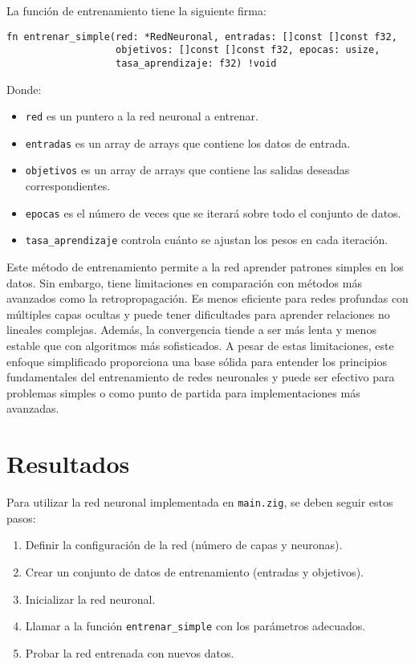 \documentclass[twocolumn]{article}
\begin{document}
La función de entrenamiento tiene la siguiente firma:
\begin{lstlisting}[style=customcode]
fn entrenar_simple(red: *RedNeuronal, entradas: []const []const f32, 
                   objetivos: []const []const f32, epocas: usize, 
                   tasa_aprendizaje: f32) !void
\end{lstlisting}

Donde:
\begin{itemize}
    \item \texttt{red} es un puntero a la red neuronal a entrenar.
    \item \texttt{entradas} es un array de arrays que contiene los datos de entrada.
    \item \texttt{objetivos} es un array de arrays que contiene las salidas deseadas correspondientes.
    \item \texttt{epocas} es el número de veces que se iterará sobre todo el conjunto de datos.
    \item \texttt{tasa\_aprendizaje} controla cuánto se ajustan los pesos en cada iteración.
\end{itemize}

Este método de entrenamiento permite a la red aprender patrones simples en los datos. Sin embargo, tiene limitaciones en comparación con métodos más avanzados como la retropropagación. Es menos eficiente para redes profundas con múltiples capas ocultas y puede tener dificultades para aprender relaciones no lineales complejas. Además, la convergencia tiende a ser más lenta y menos estable que con algoritmos más sofisticados. A pesar de estas limitaciones, este enfoque simplificado proporciona una base sólida para entender los principios fundamentales del entrenamiento de redes neuronales y puede ser efectivo para problemas simples o como punto de partida para implementaciones más avanzadas.

\section{Resultados}
Para utilizar la red neuronal implementada en \texttt{main.zig}, se deben seguir estos pasos:

\begin{enumerate}
    \item Definir la configuración de la red (número de capas y neuronas).
    \item Crear un conjunto de datos de entrenamiento (entradas y objetivos).
    \item Inicializar la red neuronal.
    \item Llamar a la función \texttt{entrenar\_simple} con los parámetros adecuados.
    \item Probar la red entrenada con nuevos datos.
\end{enumerate}
\end{document}
